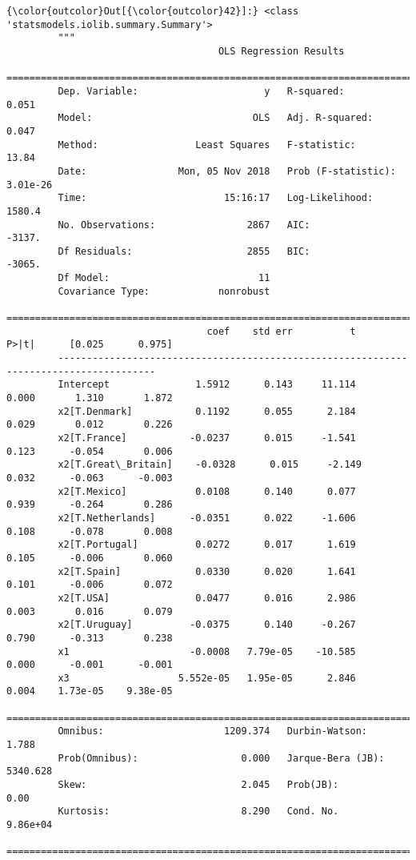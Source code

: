 \documentclass[11pt]{article}
\begin{document}
\begin{Verbatim}[commandchars=\\\{\}]
{\color{outcolor}Out[{\color{outcolor}42}]:} <class 'statsmodels.iolib.summary.Summary'>
         """
                                     OLS Regression Results                            
         ==============================================================================
         Dep. Variable:                      y   R-squared:                       0.051
         Model:                            OLS   Adj. R-squared:                  0.047
         Method:                 Least Squares   F-statistic:                     13.84
         Date:                Mon, 05 Nov 2018   Prob (F-statistic):           3.01e-26
         Time:                        15:16:17   Log-Likelihood:                 1580.4
         No. Observations:                2867   AIC:                            -3137.
         Df Residuals:                    2855   BIC:                            -3065.
         Df Model:                          11                                         
         Covariance Type:            nonrobust                                         
         =======================================================================================
                                   coef    std err          t      P>|t|      [0.025      0.975]
         ---------------------------------------------------------------------------------------
         Intercept               1.5912      0.143     11.114      0.000       1.310       1.872
         x2[T.Denmark]           0.1192      0.055      2.184      0.029       0.012       0.226
         x2[T.France]           -0.0237      0.015     -1.541      0.123      -0.054       0.006
         x2[T.Great\_Britain]    -0.0328      0.015     -2.149      0.032      -0.063      -0.003
         x2[T.Mexico]            0.0108      0.140      0.077      0.939      -0.264       0.286
         x2[T.Netherlands]      -0.0351      0.022     -1.606      0.108      -0.078       0.008
         x2[T.Portugal]          0.0272      0.017      1.619      0.105      -0.006       0.060
         x2[T.Spain]             0.0330      0.020      1.641      0.101      -0.006       0.072
         x2[T.USA]               0.0477      0.016      2.986      0.003       0.016       0.079
         x2[T.Uruguay]          -0.0375      0.140     -0.267      0.790      -0.313       0.238
         x1                     -0.0008   7.79e-05    -10.585      0.000      -0.001      -0.001
         x3                   5.552e-05   1.95e-05      2.846      0.004    1.73e-05    9.38e-05
         ==============================================================================
         Omnibus:                     1209.374   Durbin-Watson:                   1.788
         Prob(Omnibus):                  0.000   Jarque-Bera (JB):             5340.628
         Skew:                           2.045   Prob(JB):                         0.00
         Kurtosis:                       8.290   Cond. No.                     9.86e+04
         ==============================================================================
         

\end{Verbatim}
\end{document}
